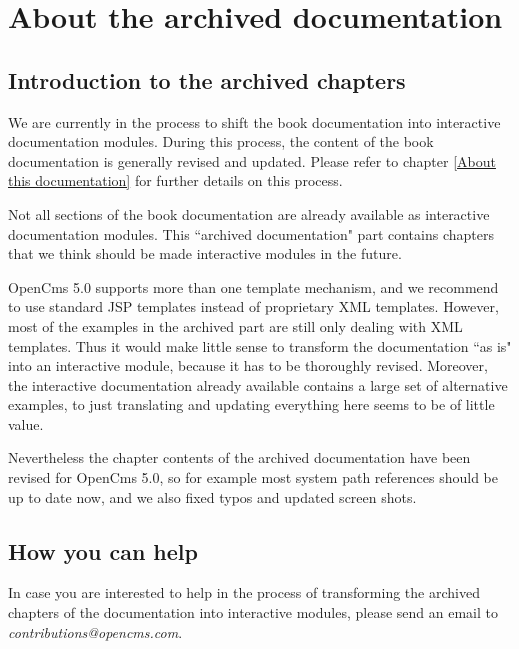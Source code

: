 \chapter{About the archived documentation}
\label{About the archived documentation}

\section{Introduction to the archived chapters}

We are currently in the process to shift the book documentation
into interactive documentation modules. During this process, the
content of the book documentation is generally revised and updated.
Please refer to chapter \ref{About this documentation} for further details on this process.

Not all sections of the book documentation are already available
as interactive documentation modules.
This ``archived documentation" part contains chapters that
we think should be made interactive modules in the future. 

OpenCms 5.0 supports more than one template mechanism, and we 
recommend to use standard JSP templates instead of proprietary XML templates. 
However, most of the examples in the archived part are still only 
dealing with XML templates. 
Thus it would make little sense
to transform the documentation ``as is" into an interactive module,
because it has to be thoroughly revised. 
Moreover, the interactive documentation already available 
contains a large set of alternative examples,
to just translating and updating everything here seems to be of little value.

Nevertheless the chapter contents of the archived documentation
have been revised for OpenCms 5.0,
so for example most system path references should be up to date now,
and we also fixed typos and updated screen shots.

\section{How you can help}

In case you are interested to help in the process of transforming the 
archived chapters of the documentation into interactive modules, 
please send an email to {\em contributions@opencms.com}.